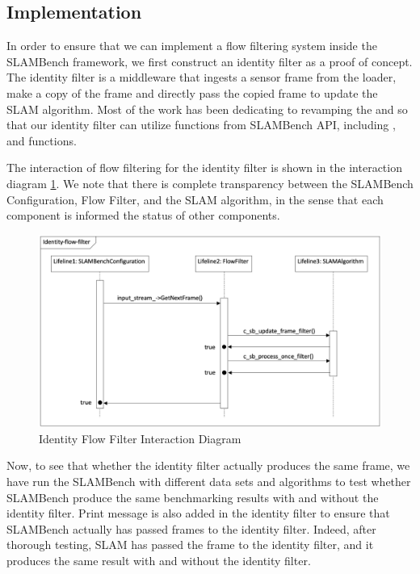 \subsection{Implementation}

In order to ensure that we can implement a flow filtering system inside the SLAMBench framework, we first construct an identity filter as a proof of concept. 
The identity filter is a middleware that ingests a sensor frame from the loader, make a copy of the frame and directly pass the copied frame to update the SLAM algorithm. 
Most of the work has been dedicating to revamping the  and  so that our identity filter can utilize functions from SLAMBench API, including , and  functions. 

The interaction of flow filtering for the identity filter is shown in the interaction diagram \ref{fig:flowinteract}. We note that there is complete transparency between the SLAMBench Configuration, Flow Filter, and the SLAM algorithm, in the sense that each component is informed the status of other components. 

\begin{figure}[!htbp]
	\caption{\label{fig:flowinteract}Identity Flow Filter Interaction Diagram}
	\includegraphics[width=14cm]{figures/interaction-diagram.png}
	\centering
\end{figure}

Now, to see that whether the identity filter actually produces the same frame, we have run the SLAMBench with different data sets and algorithms to test whether SLAMBench produce the same benchmarking results with and without the identity filter. Print message is also added in the identity filter to ensure that SLAMBench actually has passed frames to the identity filter. Indeed, after thorough testing, SLAM has passed the frame to the identity filter, and it produces the same result with and without the identity filter. 

